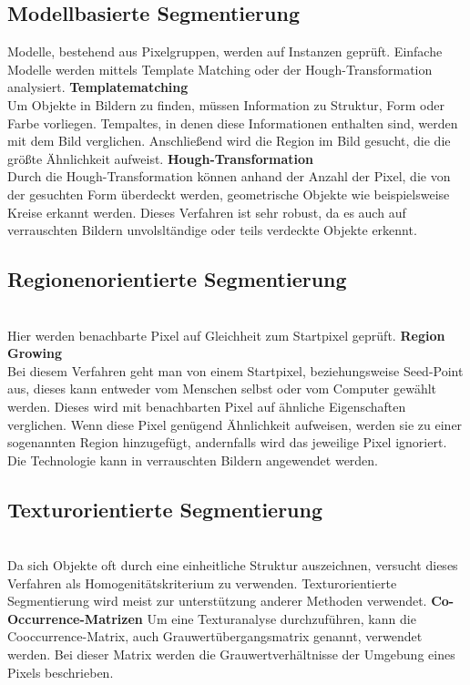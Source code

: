     \subsection*{Modellbasierte Segmentierung} 
    Modelle, bestehend aus Pixelgruppen, werden auf Instanzen geprüft. Einfache Modelle werden mittels Template Matching oder der Hough-Transformation analysiert. \cite{Seg_modell}
    \textbf{Templatematching}\\
    Um Objekte in Bildern zu finden, müssen Information zu Struktur, Form oder Farbe vorliegen. Tempaltes, in denen diese Informationen enthalten sind, werden mit dem Bild verglichen. Anschließend wird die Region im Bild gesucht, die die größte Ähnlichkeit aufweist.
    \textbf{Hough-Transformation}\\
    Durch die Hough-Transformation können anhand der Anzahl der Pixel, die von der gesuchten Form überdeckt werden, geometrische Objekte wie beispielsweise Kreise erkannt werden. Dieses Verfahren ist sehr robust, da es auch auf verrauschten Bildern unvolsltändige oder teils verdeckte Objekte erkennt.

    \subsection*{Regionenorientierte Segmentierung}\\ \cite{Seg_region}
    Hier werden benachbarte Pixel auf Gleichheit zum Startpixel geprüft.
    \textbf{Region Growing}\\ 
    Bei diesem Verfahren geht man von einem Startpixel, beziehungsweise Seed-Point aus, dieses kann entweder vom Menschen selbst oder vom Computer gewählt werden. Dieses wird mit benachbarten Pixel auf ähnliche Eigenschaften verglichen. Wenn diese Pixel genügend Ähnlichkeit aufweisen, werden sie zu einer sogenannten Region hinzugefügt, andernfalls wird das jeweilige Pixel ignoriert. Die Technologie kann in verrauschten Bildern angewendet werden.

    \subsection*{Texturorientierte Segmentierung}\\ \cite{Seg_textur}
    Da sich Objekte oft durch eine einheitliche Struktur auszeichnen, versucht dieses Verfahren als Homogenitätskriterium zu verwenden. Texturorientierte Segmentierung wird meist zur unterstützung anderer Methoden verwendet.
    \textbf{Co-Occurrence-Matrizen}
    Um eine Texturanalyse durchzuführen, kann die Cooccurrence-Matrix, auch Grauwertübergangsmatrix genannt, verwendet werden. \cite{seg_coocc}
    Bei dieser Matrix werden die Grauwertverhältnisse der Umgebung eines Pixels beschrieben.

